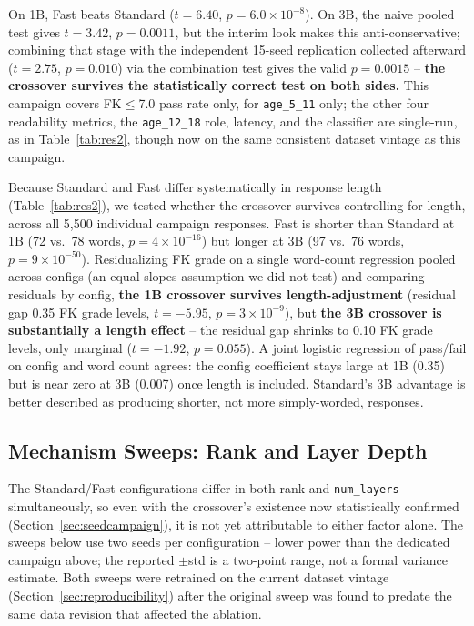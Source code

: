 \documentclass[pdflatex,sn-mathphys-num]{sn-jnl}%
\begin{document}
On 1B, Fast beats Standard ($t=6.40$, $p=6.0\times10^{-8}$). On 3B, the naive pooled test gives $t=3.42$, $p=0.0011$, but the interim look makes this anti-conservative; combining that stage with the independent 15-seed replication collected afterward ($t=2.75$, $p=0.010$) via the combination test gives the valid $p=0.0015$ -- \textbf{the crossover survives the statistically correct test on both sides.} This campaign covers FK$\leq$7.0 pass rate only, for \texttt{age\_5\_11} only; the other four readability metrics, the \texttt{age\_12\_18} role, latency, and the classifier are single-run, as in Table~\ref{tab:res2}, though now on the same consistent dataset vintage as this campaign.

Because Standard and Fast differ systematically in response length (Table~\ref{tab:res2}), we tested whether the crossover survives controlling for length, across all 5{,}500 individual campaign responses. Fast is shorter than Standard at 1B (72 vs.\ 78 words, $p=4\times10^{-16}$) but longer at 3B (97 vs.\ 76 words, $p=9\times10^{-50}$). Residualizing FK grade on a single word-count regression pooled across configs (an equal-slopes assumption we did not test) and comparing residuals by config, \textbf{the 1B crossover survives length-adjustment} (residual gap 0.35 FK grade levels, $t=-5.95$, $p=3\times10^{-9}$), but \textbf{the 3B crossover is substantially a length effect} -- the residual gap shrinks to 0.10 FK grade levels, only marginal ($t=-1.92$, $p=0.055$). A joint logistic regression of pass/fail on config and word count agrees: the config coefficient stays large at 1B (0.35) but is near zero at 3B (0.007) once length is included. Standard's 3B advantage is better described as producing shorter, not more simply-worded, responses.

\subsection{Mechanism Sweeps: Rank and Layer Depth}\label{sec:ranksweep}

The Standard/Fast configurations differ in both rank and \texttt{num\_layers} simultaneously, so even with the crossover's existence now statistically confirmed (Section~\ref{sec:seedcampaign}), it is not yet attributable to either factor alone. The sweeps below use two seeds per configuration -- lower power than the dedicated campaign above; the reported $\pm$std is a two-point range, not a formal variance estimate. Both sweeps were retrained on the current dataset vintage (Section~\ref{sec:reproducibility}) after the original sweep was found to predate the same data revision that affected the ablation.
\end{document}
